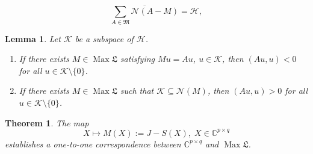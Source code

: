 \documentclass[10pt,a4paper]{amsart}
\newtheorem{theorem}{Theorem}
\newtheorem{lemma}{Lemma}
\DeclareMathOperator{\Max}{Max}
\newcommand{\frakL}{\mathfrak L}
\newcommand{\frakM}{\mathfrak M}
\begin{document}
\begin{equation}
\label{eq4.3}
\overline{\sum_{A\in\frakM}\mathscr N(A-M)} = \mathscr H,  
\end{equation}

\begin{lemma}
\label{lem5.4}
Let $\mathscr K$ be a subspace of $\mathscr H$.
\begin{enumerate}
\item[(i)]
  If there exists $M\in\Max\frakL$ satisfying $Mu=Au$, $u\in\mathscr
  K$, then $(Au,u)<0$ for all $u\in\mathscr K\setminus\{0\}$.
\item[(ii)]
  If there exists $M\in\Max\frakL$ such that $\mathscr
  K\subseteq\mathscr N(M)$, then $(Au,u)>0$ for all  $u\in\mathscr
  K\setminus\{0\}$.
\end{enumerate}
\end{lemma}

\begin{theorem}
\label{thm5.5}
The map
\[
X\mapsto M(X) := J - S(X), \; X\in\mathbb C^{p\times q}
\]
establishes a one-to-one correspondence between
$\mathbb C^{p\times q}$ and $\Max\frakL$. 
\end{theorem}
\end{document}
